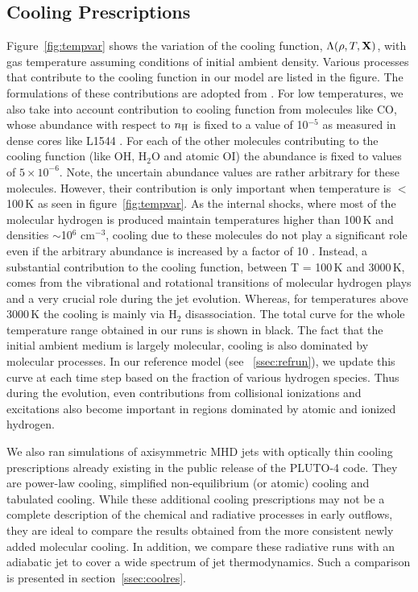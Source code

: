 \documentclass[useAMS,usenatbib]{mn2e}
\begin{document}
\subsection{Cooling Prescriptions}
%
Figure~\ref{fig:tempvar} shows the variation
of the cooling function, $\Lambda(\rho,T,{\bf{X}})$, with gas
temperature assuming conditions of initial ambient density. 
Various processes that contribute to the cooling function in our model
are listed in the figure. The formulations of these contributions
are adopted from \citep[][and references therein]{Smith:2003p9985, OSullivan:2009p10078}.
For low temperatures, we also 
take into account contribution to cooling function from molecules like
CO, whose abundance with respect to $n_{\rm H}$ is fixed to a
value of 10$^{-5}$ as measured in dense cores like L1544 \citep{Keto:2010p15549}. 
For each of the other molecules contributing to the cooling function (like OH, H$_{2}$O and atomic OI)
the abundance is fixed to values of $5\times10^{-6}$. Note, the
uncertain abundance values are rather arbitrary for these molecules. 
However, their contribution is only important when temperature is $<$
100\,K as seen in figure~\ref{fig:tempvar}. As the internal shocks, where most
of the molecular hydrogen is produced maintain temperatures higher
than 100\,K and densities $\sim$10$^{6}$ cm$^{-3}$, cooling due to these molecules do not
play a significant role even if the arbitrary abundance is increased
by a factor of 10 \citep{Smith:2003p9985}. Instead, a substantial contribution to the cooling
function, between T = 100\,K and 3000\,K, 
comes from the vibrational and rotational transitions of
molecular hydrogen plays and a very crucial role during the jet
evolution. Whereas, for temperatures above 3000\,K the
cooling is mainly via H$_{2}$ disassociation. The total curve for the
whole temperature range obtained in our runs is shown in black.
The fact that the initial ambient medium is largely molecular, cooling is also dominated by
molecular processes. In our reference model (see ~\ref{ssec:refrun}), 
we update this curve at each time step based on the fraction of
various hydrogen species. Thus during the evolution, even
contributions from collisional ionizations and excitations also become
important in regions dominated by atomic and ionized hydrogen.
%

We also ran simulations of axisymmetric MHD jets
with optically thin cooling prescriptions already existing in the public
release of the PLUTO-4 code. They are power-law cooling, 
simplified non-equilibrium (or atomic) cooling and tabulated
cooling. While these additional cooling prescriptions may not be a complete description of
the chemical and radiative processes in early outflows, they are ideal
to compare the results obtained from the more consistent newly added molecular
cooling. In addition, we compare these radiative runs with an adiabatic jet 
to cover a wide spectrum of jet thermodynamics. 
Such a comparison is presented in section~\ref{ssec:coolres}.
\end{document}
